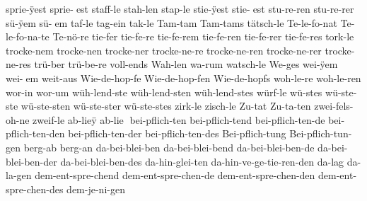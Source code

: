 {  sprie-^^ffest %
  sprie-^^Yest
  staff-le %
  stah-len %
  stap-le %
  stie-^^ffest %
  stie-^^Yest
  stu-re-ren %
  stu-re-rer %
  s^^fc-^^ffem %
  s^^fc-^^Yem
  taf-le %
  tag-ein %
  tak-le %
  Tam-tam %
  Tam-tams %
  t^^e4tsch-le %
  Te-le-fo-nat %
  Te-le-fo-na-te %
  Te-n^^f6-re %
  tie-fer %
  tie-fe-re %
  tie-fe-rem %
  tie-fe-ren %
  tie-fe-rer %
  tie-fe-res %
  tork-le %
  trocke-nem %
  trocke-nen %
  trocke-ner %
  trocke-ne-re %
  trocke-ne-ren %
  trocke-ne-rer %
  trocke-ne-res %
  tr^^fc-ber %
  tr^^fc-be-re %
  voll-ends %
  Wah-len %
  wa-rum %
  watsch-le %
  We-ges %
  wei-^^ffem %
  wei-^^Yem
  weit-aus %
  Wie-de-hop-fe %
  Wie-de-hop-fen %
  Wie-de-hopfs %
  woh-le-re %
  woh-le-ren %
  wor-in %
  wor-um %
  w^^fch-lend-ste %
  w^^fch-lend-sten %
  w^^fch-lend-stes %
  w^^fcrf-le %
  w^^fc-stes %
  w^^fc-ste-ste %
  w^^fc-ste-sten %
  w^^fc-ste-ster %
  w^^fc-ste-stes %
  zirk-le %
  zisch-le %
  Zu-tat %
  Zu-ta-ten %
  zwei-fels-oh-ne %
  zweif-le %
%
%
%
  ab-lie^^ff %
  ab-lie^^Y
  bei-pflich-ten %
  bei-pflich-tend %
  bei-pflich-ten-de %
  bei-pflich-ten-den %
  bei-pflich-ten-der %
  bei-pflich-ten-des %
  Bei-pflich-tung %
  Bei-pflich-tun-gen %
  berg-ab %
  berg-an %
  da-bei-blei-ben %
  da-bei-blei-bend %
  da-bei-blei-ben-de %
  da-bei-blei-ben-der %
  da-bei-blei-ben-des %
  da-hin-glei-ten %
  da-hin-ve-ge-tie-ren-den %
  da-lag %
  da-la-gen %
  dem-ent-spre-chend %
  dem-ent-spre-chen-de %
  dem-ent-spre-chen-den %
  dem-ent-spre-chen-des %
  dem-je-ni-gen %
}
